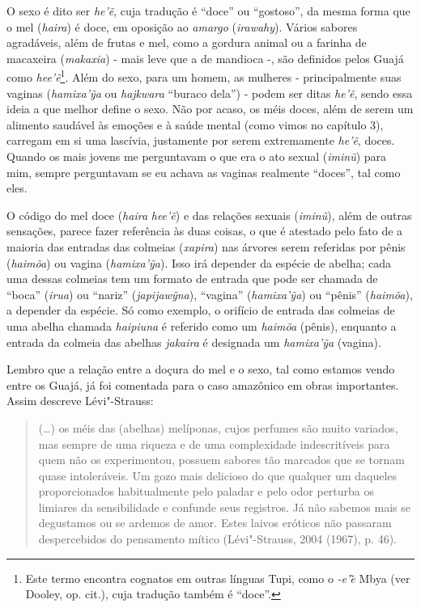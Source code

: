 O sexo é dito ser \emph{he'ẽ}, cuja tradução é ``doce'' ou ``gostoso'', da
mesma forma que o mel (\emph{haira}) é doce, em oposição ao
\emph{amargo} (\emph{irawahy}). Vários sabores agradáveis, além de
frutas e mel, como a gordura animal ou a farinha de macaxeira
(\emph{makaxia}) - mais leve que a de mandioca -, são definidos pelos
Guajá como \emph{hee'ẽ}\footnote{Este termo encontra cognatos em outras
  línguas Tupi, como o \emph{-e'e}̃ Mbya (ver Dooley, op. cit.), cuja
  tradução também é ``doce''.}. Além do sexo, para um homem, as mulheres -
principalmente suas vaginas (\emph{hamixa'ỹa} ou \emph{hajkwara}
``buraco dela'') - podem ser ditas \emph{he'ẽ}, sendo essa ideia a que
melhor define o sexo. Não por acaso, os méis doces, além de serem um
alimento saudável às emoções e à saúde mental (como vimos no capítulo
3), carregam em si uma lascívia, justamente por serem extremamente
\emph{he'ẽ}, doces. Quando os mais jovens me perguntavam o que era o ato
sexual (\emph{iminũ}) para mim, sempre perguntavam se eu achava as
vaginas realmente ``doces'', tal como eles.

O código do mel doce (\emph{haira} \emph{hee'ẽ}) e das relações sexuais
(\emph{iminũ}), além de outras sensações, parece fazer referência às
duas coisas, o que é atestado pelo fato de a maioria das entradas das
colmeias (\emph{xapira}) nas árvores serem referidas por pênis
(\emph{haimõa}) ou vagina (\emph{hamixa'ỹa}). Isso irá depender da
espécie de abelha; cada uma dessas colmeias tem um formato de entrada
que pode ser chamada de ``boca'' (\emph{irua}) ou ``nariz''
(\emph{japijawỹna}), ``vagina'' (\emph{hamixa'ỹa}) ou ``pênis''
(\emph{haimõa}), a depender da espécie. Só como exemplo, o orifício de
entrada das colmeias de uma abelha chamada \emph{haipiuna} é referido
como um \emph{haimõa} (pênis), enquanto a entrada da colmeia das abelhas
\emph{jakaira} é designada um \emph{hamixa'ỹa} (vagina).

Lembro que a relação entre a doçura do mel e o sexo, tal como estamos
vendo entre os Guajá, já foi comentada para o caso amazônico em obras
importantes. Assim descreve Lévi"-Strauss:

\begin{quote}
(\ldots{}) os méis das (abelhas) melíponas, cujos perfumes são muito
variados, mas sempre de uma riqueza e de uma complexidade indescritíveis
para quem não os experimentou, possuem sabores tão marcados que se
tornam quase intoleráveis. Um gozo mais delicioso do que qualquer um
daqueles proporcionados habitualmente pelo paladar e pelo odor perturba
os limiares da sensibilidade e confunde seus registros. Já não sabemos
mais se degustamos ou se ardemos de amor. Estes laivos eróticos não
passaram despercebidos do pensamento mítico (Lévi"-Strauss, 2004 (1967),
p. 46).
\end{quote}


